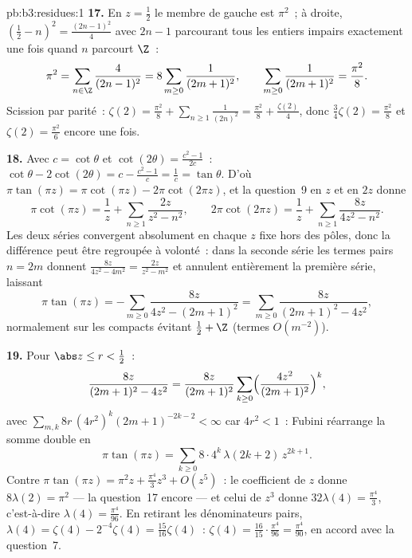 \begin{solution}{pb:b3:residues:1}
\textbf{17.} En $z = \frac12$ le membre de gauche est
$\pi^2$~; à droite, $(\frac12 - n)^2 =
\frac{(2n-1)^2}4$ avec $2n - 1$ parcourant tous les entiers
impairs exactement une fois quand $n$ parcourt $\Z$~:
\[
\pi^2 = \sum_{n\in\Z}\frac{4}{(2n-1)^2}
= 8\sum_{m\geq0}\frac1{(2m+1)^2},
\qquad
\sum_{m\geq0}\frac1{(2m+1)^2} = \frac{\pi^2}8 .
\]
Scission par parité~: $\zeta(2) = \frac{\pi^2}8 +
\sum_{n\geq1}\frac1{(2n)^2} = \frac{\pi^2}8 +
\frac{\zeta(2)}4$, donc $\frac34\zeta(2) = \frac{\pi^2}8$ et
$\zeta(2) = \frac{\pi^2}6$ encore une fois.

\textbf{18.} Avec $c = \cot\theta$ et $\cot(2\theta) =
\frac{c^2-1}{2c}$~: $\cot\theta - 2\cot(2\theta) = c -
\frac{c^2-1}c = \frac1c = \tan\theta$. D'où $\pi\tan(\pi z)
= \pi\cot(\pi z) - 2\pi\cot(2\pi z)$, et la question~9 en
$z$ et en $2z$ donne
\[
\pi\cot(\pi z) = \frac1z +
\sum_{n\geq1}\frac{2z}{z^2 - n^2},
\qquad
2\pi\cot(2\pi z) = \frac1z +
\sum_{n\geq1}\frac{8z}{4z^2 - n^2} .
\]
Les deux séries convergent absolument en chaque $z$ fixe
hors des pôles, donc la différence peut être regroupée à
volonté~: dans la seconde série les termes pairs $n = 2m$
donnent $\frac{8z}{4z^2 - 4m^2} = \frac{2z}{z^2 - m^2}$ et
annulent entièrement la première série, laissant
\[
\pi\tan(\pi z) = -\sum_{m\geq0}\frac{8z}{4z^2 - (2m+1)^2}
= \sum_{m\geq0}\frac{8z}{(2m+1)^2 - 4z^2} ,
\]
normalement sur les compacts évitant $\frac12 + \Z$ (termes
$O(m^{-2})$).

\textbf{19.} Pour $\abs z \leq r < \frac12$~:
\[
\frac{8z}{(2m+1)^2 - 4z^2} = \frac{8z}{(2m+1)^2}
\sum_{k\geq0}\Bigl(\frac{4z^2}{(2m+1)^2}\Bigr)^{k},
\]
avec $\sum_{m,k}8r\,(4r^2)^k(2m+1)^{-2k-2} < \infty$ car
$4r^2 < 1$~: Fubini réarrange la somme double en
\[
\pi\tan(\pi z) =
\sum_{k\geq0}8\cdot4^k\,\lambda(2k+2)\,z^{2k+1} .
\]
Contre $\pi\tan(\pi z) = \pi^2z + \frac{\pi^4}3z^3 +
O(z^5)$~: le coefficient de $z$ donne $8\lambda(2) = \pi^2$
--- la question~17 encore --- et celui de $z^3$ donne
$32\lambda(4) = \frac{\pi^4}3$, c'est-à-dire $\lambda(4) =
\frac{\pi^4}{96}$. En retirant les dénominateurs pairs,
$\lambda(4) = \zeta(4) - 2^{-4}\zeta(4) =
\frac{15}{16}\zeta(4)$~: $\zeta(4) = \frac{16}{15}\cdot
\frac{\pi^4}{96} = \frac{\pi^4}{90}$, en accord avec la
question~7.


\end{solution}
